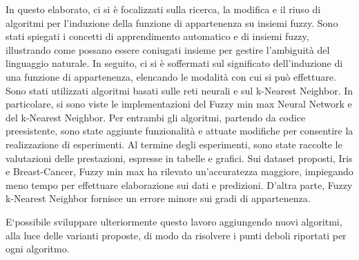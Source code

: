 \documentclass[11pt,  oneside, openany]{book}
\begin{document}
In questo elaborato, ci si è focalizzati sulla ricerca, la modifica e il riuso di algoritmi per l'induzione della funzione di appartenenza su insiemi fuzzy. Sono stati spiegati i concetti di apprendimento automatico e di insiemi fuzzy, illustrando come possano essere coniugati insieme per gestire l'ambiguità del linguaggio naturale. In seguito, ci si è soffermati sul significato dell'induzione di una funzione di appartenenza, elencando le modalità con cui si può effettuare. Sono stati utilizzati algoritmi basati sulle reti neurali e sul k-Nearest Neighbor. In particolare, si sono viste le implementazioni del Fuzzy min max Neural Network e del k-Nearest Neighbor. Per entrambi gli algoritmi, partendo da codice preesistente, sono state aggiunte funzionalità e attuate modifiche per consentire la realizzazione di esperimenti. Al termine degli esperimenti, sono state raccolte le valutazioni delle prestazioni, espresse in tabelle e grafici. Sui dataset proposti, Iris e Breast-Cancer, Fuzzy min max ha rilevato un'accuratezza maggiore, impiegando meno tempo per effettuare elaborazione sui dati e predizioni. D'altra parte, Fuzzy k-Nearest Neighbor fornisce un errore minore sui gradi di appartenenza. 

E`possibile sviluppare ulteriormente questo lavoro aggiungendo nuovi algoritmi, alla luce delle varianti proposte, di modo da risolvere i punti deboli riportati per ogni algoritmo. 




\end{document}
